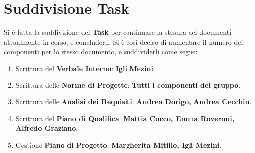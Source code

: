 	\section{Suddivisione Task}
Si è fatta la suddivisione dei \textbf{Task} per continuare la stesura dei documenti attualmente in corso, e concluderli.
	Si è così deciso di aumentare il numero dei componenti per lo stesso documento, e suddividerli come segue:
	\begin{enumerate}
		\item Scrittura del \textbf{Verbale Interno}: \textbf{Igli Mezini}
		\item Scrittura delle \textbf{Norme di Progetto}: \textbf{Tutti i componenti del gruppo}.
		\item Scrittura delle \textbf{Analisi dei Requisiti}: \textbf{Andrea Dorigo, Andrea Cecchin}.
		\item Scrittura del \textbf{Piano di Qualifica}: \textbf{Mattia Cocco, Emma Roveroni, Alfredo Graziano}.
		\item Gestione \textbf{Piano di Progetto}: \textbf{Margherita Mitillo, Igli Mezini}.
	\end{enumerate}